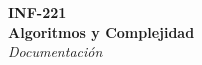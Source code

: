 \thispagestyle{empty}

\begin{center}
    \Huge
    \textbf{INF-221 \\ Algoritmos y Complejidad} \\
    \emph{Documentación}
\end{center}

